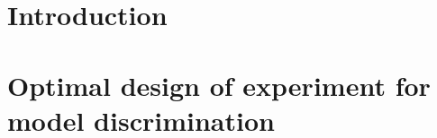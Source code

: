 \documentclass[a4paper,fleqn]{cas-dc}
\begin{document}
\maketitle


\section{Introduction}








%

\section{Optimal design of experiment for model discrimination} \label{CH: DOE}



%



\newpage
%



%
\end{document}
